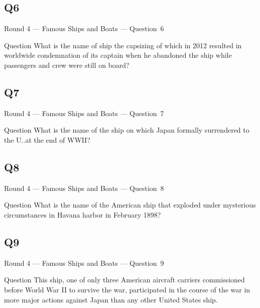 \documentclass[11pt]{beamer}
\begin{document}
\subsection*{Q6}
\begin{frame}[t]{Round 4 --- Famous Ships and Boats --- \mbox{Question 6}}
\vspace{-0.5em}
\begin{block}{Question}
What is the name of ship the capsizing of which in  2012 resulted in worldwide condemnation of its captain when he abandoned the ship while passengers and crew were still on board?
\end{block}
\end{frame}
\subsection*{Q7}
\begin{frame}[t]{Round 4 --- Famous Ships and Boats --- \mbox{Question 7}}
\vspace{-0.5em}
\begin{block}{Question}
What is the name of the ship on which Japan formally surrendered to the U.\@S.\@ at the end of WWII\@?
\end{block}
\end{frame}
\subsection*{Q8}
\begin{frame}[t]{Round 4 --- Famous Ships and Boats --- \mbox{Question 8}}
\vspace{-0.5em}
\begin{block}{Question}
What is the name of the  American ship that exploded under mysterious circumstances in Havana harbor in February 1898? 
\end{block}
\end{frame}
\subsection*{Q9}
\begin{frame}[t]{Round 4 --- Famous Ships and Boats --- \mbox{Question 9}}
\vspace{-0.5em}
\begin{block}{Question}
This ship, one of only three American aircraft carriers commissioned before World War II to survive the war, participated in the course of the war in more major actions against Japan than any other United States ship.
\end{block}
\end{frame}
\end{document}
